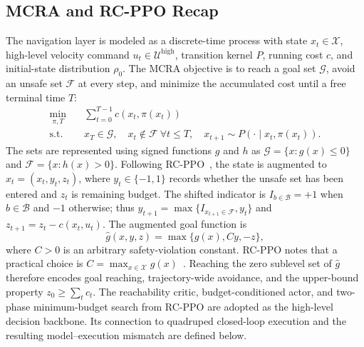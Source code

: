 \documentclass[conference]{IEEEtran}
\begin{document}
\subsection{MCRA and RC-PPO Recap}
The navigation layer is modeled as a discrete-time process with state $x_t\in
\mathcal{X}$, high-level velocity command $u_t\in\mathcal{U}^{\mathrm{high}}$,
transition kernel $P$, running cost $c$, and initial-state distribution $\rho_0$.
The MCRA objective is to reach a goal set $\mathcal{G}$, avoid an unsafe set
$\mathcal{F}$ at every step, and minimize the accumulated cost until a free terminal
time $T$:
\begin{align}
\min_{\pi,T}\quad &\sum_{t=0}^{T-1}c(x_t,\pi(x_t))\\
\mathrm{s.t.}\quad &x_T\in\mathcal{G},\quad x_t\notin\mathcal{F}\ \forall t\leq T,
\quad x_{t+1}\sim P(\cdot\mid x_t,\pi(x_t)).
\end{align}
The sets are represented using signed functions $g$ and $h$ as
$\mathcal{G}=\{x:g(x)\leq0\}$ and $\mathcal{F}=\{x:h(x)>0\}$. Following
RC-PPO~\cite{so2024}, the state is augmented to $\hat{x}_t=(x_t,y_t,z_t)$,
where $y_t\in\{-1,1\}$ records whether the unsafe set has been entered and $z_t$
is remaining budget. The shifted indicator is
$I_{b\in\mathcal{B}}=+1$ when $b\in\mathcal{B}$ and $-1$ otherwise; thus
$y_{t+1}=\max\{I_{x_{t+1}\in\mathcal{F}},y_t\}$ and
$z_{t+1}=z_t-c(x_t,u_t)$. The augmented goal function is
\begin{equation}
\hat{g}(x,y,z)=\max\{g(x),Cy,-z\},
\end{equation}
where $C>0$ is an arbitrary safety-violation constant. RC-PPO notes that a
practical choice is $C=\max_{x\in\mathcal{X}}g(x)$~\cite{so2024}. Reaching the
zero sublevel set of $\hat{g}$ therefore encodes goal reaching, trajectory-wide
avoidance, and the upper-bound property $z_0\geq\sum_t c_t$. The reachability critic,
budget-conditioned actor, and two-phase minimum-budget search from RC-PPO are
adopted as the high-level decision backbone. Its connection to quadruped closed-loop
execution and the resulting model--execution mismatch are defined below.
\end{document}
